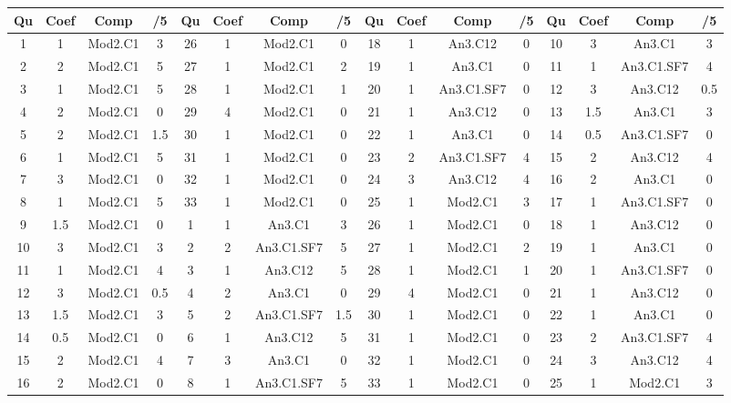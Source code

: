 \begin{center} 
\begin{tabular}{|c|c|c|c||c|c|c|c||c|c|c|c||c|c|c|c|} 
\hline \textbf{Qu} & \textbf{Coef} & \textbf{Comp} & \textbf{/5} & \textbf{Qu} & \textbf{Coef} & \textbf{Comp} & \textbf{/5} & \textbf{Qu} & \textbf{Coef} & \textbf{Comp} & \textbf{/5} & \textbf{Qu} & \textbf{Coef} & \textbf{Comp} & \textbf{/5} \\ 
\hline 
\hline 
1 & 1 & Mod2.C1 & 3 & 26 & 1 & Mod2.C1 & 0 & 18 & 1 & An3.C12 & 0 & 10 & 3 & An3.C1 & 3 \\ \hline 
2 & 2 & Mod2.C1 & 5 & 27 & 1 & Mod2.C1 & 2 & 19 & 1 & An3.C1 & 0 & 11 & 1 & An3.C1.SF7 & 4 \\ \hline 
3 & 1 & Mod2.C1 & 5 & 28 & 1 & Mod2.C1 & 1 & 20 & 1 & An3.C1.SF7 & 0 & 12 & 3 & An3.C12 & 0.5 \\ \hline 
4 & 2 & Mod2.C1 & 0 & 29 & 4 & Mod2.C1 & 0 & 21 & 1 & An3.C12 & 0 & 13 & 1.5 & An3.C1 & 3 \\ \hline 
5 & 2 & Mod2.C1 & 1.5 & 30 & 1 & Mod2.C1 & 0 & 22 & 1 & An3.C1 & 0 & 14 & 0.5 & An3.C1.SF7 & 0 \\ \hline 
6 & 1 & Mod2.C1 & 5 & 31 & 1 & Mod2.C1 & 0 & 23 & 2 & An3.C1.SF7 & 4 & 15 & 2 & An3.C12 & 4 \\ \hline 
7 & 3 & Mod2.C1 & 0 & 32 & 1 & Mod2.C1 & 0 & 24 & 3 & An3.C12 & 4 & 16 & 2 & An3.C1 & 0 \\ \hline 
8 & 1 & Mod2.C1 & 5 & 33 & 1 & Mod2.C1 & 0 & 25 & 1 & Mod2.C1 & 3 & 17 & 1 & An3.C1.SF7 & 0 \\ \hline 
9 & 1.5 & Mod2.C1 & 0 & 1 & 1 & An3.C1 & 3 & 26 & 1 & Mod2.C1 & 0 & 18 & 1 & An3.C12 & 0 \\ \hline 
10 & 3 & Mod2.C1 & 3 & 2 & 2 & An3.C1.SF7 & 5 & 27 & 1 & Mod2.C1 & 2 & 19 & 1 & An3.C1 & 0 \\ \hline 
11 & 1 & Mod2.C1 & 4 & 3 & 1 & An3.C12 & 5 & 28 & 1 & Mod2.C1 & 1 & 20 & 1 & An3.C1.SF7 & 0 \\ \hline 
12 & 3 & Mod2.C1 & 0.5 & 4 & 2 & An3.C1 & 0 & 29 & 4 & Mod2.C1 & 0 & 21 & 1 & An3.C12 & 0 \\ \hline 
13 & 1.5 & Mod2.C1 & 3 & 5 & 2 & An3.C1.SF7 & 1.5 & 30 & 1 & Mod2.C1 & 0 & 22 & 1 & An3.C1 & 0 \\ \hline 
14 & 0.5 & Mod2.C1 & 0 & 6 & 1 & An3.C12 & 5 & 31 & 1 & Mod2.C1 & 0 & 23 & 2 & An3.C1.SF7 & 4 \\ \hline 
15 & 2 & Mod2.C1 & 4 & 7 & 3 & An3.C1 & 0 & 32 & 1 & Mod2.C1 & 0 & 24 & 3 & An3.C12 & 4 \\ \hline 
16 & 2 & Mod2.C1 & 0 & 8 & 1 & An3.C1.SF7 & 5 & 33 & 1 & Mod2.C1 & 0 & 25 & 1 & Mod2.C1 & 3 \\ \hline 

\end{tabular}
\end{center}
